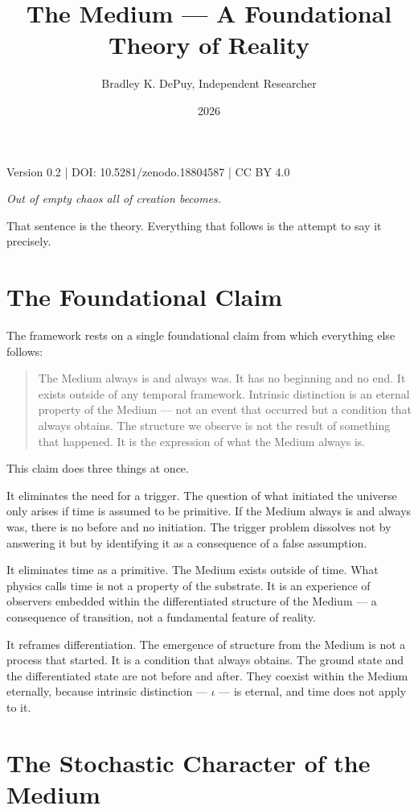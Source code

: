 \documentclass[11pt]{article}
\author{Bradley K. DePuy, Independent Researcher}
\date{2026}
\title{The Medium — A Foundational Theory of Reality}
\begin{document}
\maketitle
\tableofcontents

Version 0.2 | DOI: 10.5281/zenodo.18804587 | CC BY 4.0

\emph{Out of empty chaos all of creation becomes.}

That sentence is the theory. Everything that follows is the attempt to say it precisely.
\section{The Foundational Claim}
\label{sec:orgd40b3c3}

The framework rests on a single foundational claim from which everything else follows:

\begin{quote}
The Medium always is and always was. It has no beginning and no end. It exists
outside of any temporal framework. Intrinsic distinction is an eternal property
of the Medium — not an event that occurred but a condition that always obtains.
The structure we observe is not the result of something that happened. It is the
expression of what the Medium always is.
\end{quote}

This claim does three things at once.

It eliminates the need for a trigger. The question of what initiated the universe
only arises if time is assumed to be primitive. If the Medium always is and always
was, there is no before and no initiation. The trigger problem dissolves not by
answering it but by identifying it as a consequence of a false assumption.

It eliminates time as a primitive. The Medium exists outside of time. What physics
calls time is not a property of the substrate. It is an experience of observers
embedded within the differentiated structure of the Medium — a consequence of
transition, not a fundamental feature of reality.

It reframes differentiation. The emergence of structure from the Medium is not a
process that started. It is a condition that always obtains. The ground state and
the differentiated state are not before and after. They coexist within the Medium
eternally, because intrinsic distinction — \(\iota\) — is eternal, and time does
not apply to it.
\section{The Stochastic Character of the Medium}
\label{sec:org2d542c9}
\end{document}
